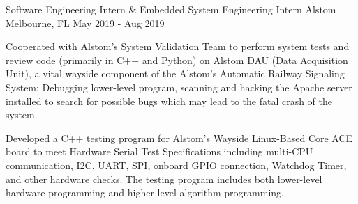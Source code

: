 \begin{cventries}
  \cventry
    {Software Engineering Intern \& Embedded System Engineering Intern} %
    {Alstom} %
    {Melbourne, FL} %
    {May 2019 - Aug 2019} %
    {
      \begin{cvitems} %
        \item {Cooperated with Alstom's System Validation Team to perform system tests and review code (primarily in C++ and Python) on Alstom DAU (Data Acquisition Unit), a vital wayside component of the Alstom's Automatic Railway Signaling System; Debugging lower-level program, scanning and hacking the Apache server installed to search for possible bugs which may lead to the fatal crash of the system.}
        \item {Developed a C++ testing program for Alstom's Wayside Linux-Based Core ACE board to meet Hardware Serial Test Specifications including multi-CPU communication, I2C, UART, SPI, onboard GPIO connection, Watchdog Timer, and other hardware checks. The testing program includes both lower-level hardware programming and higher-level algorithm programming.}
      \end{cvitems}
    }

\end{cventries}
